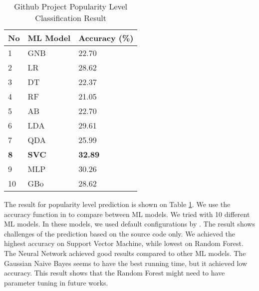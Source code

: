 \begin{table}[]
\begin{tabular}{|l|l|l|}
\hline
{\color[HTML]{000000} \textbf{No}} & {\color[HTML]{000000} \textbf{ML Model}} & {\color[HTML]{000000} \textbf{Accuracy (\%)}}        \\ \hline
{\color[HTML]{000000} 1}           & {\color[HTML]{000000} GNB}               & {\color[HTML]{000000} 22.70} \\ \hline
{\color[HTML]{000000} 2}           & {\color[HTML]{000000} LR}                & {\color[HTML]{000000} 28.62}                         \\ \hline
{\color[HTML]{000000} 3}           & {\color[HTML]{000000} DT}                & {\color[HTML]{000000} 22.37}                         \\ \hline
{\color[HTML]{000000} 4}           & {\color[HTML]{000000} RF}                & {\color[HTML]{000000} 21.05}                         \\ \hline
{\color[HTML]{000000} 5}           & {\color[HTML]{000000} AB}                & {\color[HTML]{000000} 22.70}                         \\ \hline
{\color[HTML]{000000} 6}           & {\color[HTML]{000000} LDA}               & {\color[HTML]{000000} 29.61}                         \\ \hline
{\color[HTML]{000000} 7}           & {\color[HTML]{000000} QDA}               & {\color[HTML]{000000} 25.99}                         \\ \hline
{\color[HTML]{000000} \textbf{8}}  & {\color[HTML]{000000} \textbf{SVC}}      & {\color[HTML]{000000} \textbf{32.89}}                \\ \hline
{\color[HTML]{000000} 9}           & {\color[HTML]{000000} MLP}               & {\color[HTML]{000000} 30.26}                         \\ \hline
{\color[HTML]{000000} 10}          & {\color[HTML]{000000} GBo}               & {\color[HTML]{000000} 28.62}                         \\ \hline
\end{tabular}
\label{tblRQ1}
\caption{Github Project Popularity Level Classification Result}
\end{table}

The result for popularity level prediction is shown on Table \ref{tblRQ1}. We use the accuracy function in \cite{010} to compare between ML models. We tried with 10 different ML models. In these models, we used default configurations by \cite{010}. The result shows challenges of the prediction based on the source code only. We achieved the highest accuracy on Support Vector Machine, while lowest on Random Forest. The Neural Network achieved good results compared to other ML models. The Gaussian Naive Bayes seems to have the best running time, but it achieved low accuracy. This result shows that the Random Forest might need to have parameter tuning in future works.


